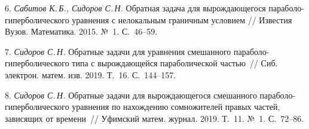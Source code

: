 6. {\it Сабитов К.\,Б., Сидоров С.\,Н.} {Обратная задача для вырождающегося параболо-гиперболического уравнения с нелокальным граничным условием // Известия Вузов. Математика. 2015. №~1. С.~46--59.}

7. {\it Сидоров С.\,Н.} {Обратные задачи для уравнения смешанного параболо-гиперболического типа с вырождающейся параболической частью~// Сиб. электрон. матем. изв. 2019. Т.~16. С.~144--157.}

8. {\it Сидоров С.\,Н.} {Обратные задачи для вырождающегося смешанного параболо-гиперболического уравнения по нахождению сомножителей правых частей, зависящих от времени~// Уфимский матем. журнал. 2019. Т.~11. №~1. С.~72--86.}
